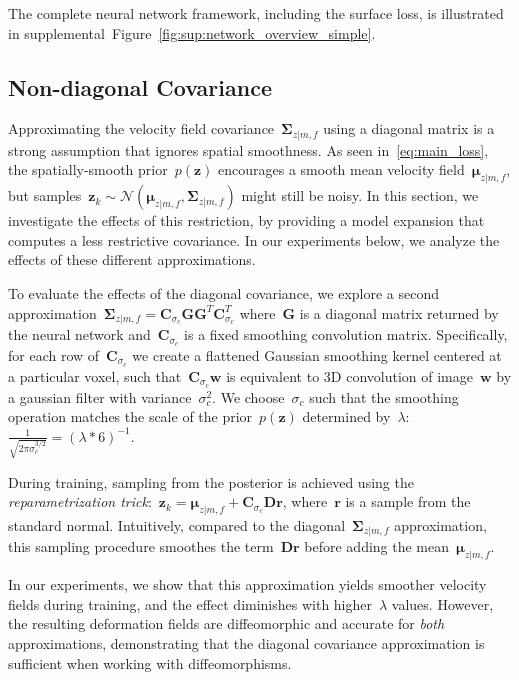 \documentclass{article}
\newcommand{\bC}{\boldsymbol{C}}
\newcommand{\bD}{\boldsymbol{D}}
\newcommand{\bw}{\boldsymbol{w}}
\newcommand{\br}{\boldsymbol{r}}
\newcommand{\bG}{\boldsymbol{G}}
\newcommand{\bmu}{\boldsymbol{\mu}}
\newcommand{\bSigma}{\boldsymbol{\Sigma}}
\newcommand{\bz}{\boldsymbol{z}}
\newcommand{\moving}{m}
\newcommand{\fixed}{f}
\begin{document}
The complete neural network framework, including the surface loss, is illustrated in supplemental~Figure~\ref{fig:sup:network_overview_simple}.




\subsection{Non-diagonal Covariance}
\label{sec:nondiag-approx}


{\color{blue} Approximating the velocity field covariance~$\bSigma_{z | \moving, \fixed}$ using a diagonal matrix is a strong assumption that ignores spatial smoothness. As seen in~\eqref{eq:main_loss}, the spatially-smooth prior~$p(\bz)$ encourages a smooth mean velocity field~$\bmu_{z | \moving, \fixed}$, but samples~\mbox{$\bz_k \sim \mathcal{N}(\bmu_{z | \moving, \fixed}, \bSigma_{z | \moving, \fixed})$} might still be noisy. In this section, we investigate the effects of this restriction, by providing a model expansion that computes a less restrictive covariance. In our experiments below, we analyze the effects of these different approximations.}


To evaluate the effects of the diagonal covariance, we explore a second approximation~$\bSigma_{z | \moving, \fixed} = \bC_{\sigma_c} \bG \bG^{T} \bC_{\sigma_c}^{T}$ where~$\bG$ is a diagonal matrix returned by the neural network and~$\bC_{\sigma_c}$ is a fixed smoothing convolution matrix.  Specifically, for each row of~$\bC_{\sigma_c}$ we create a flattened Gaussian smoothing kernel centered at a particular voxel, such that~$\bC_{\sigma_c}\bw$ is equivalent to 3D convolution of image~$\bw$ by a gaussian filter with variance~$\sigma_c^2$. We choose~$\sigma_c$ such that the smoothing operation matches the scale of the prior~$p(\bz)$ determined by~$\lambda$:~$\frac{1}{\sqrt{2\pi\sigma_c^{3/2}}} = (\lambda*6)^{-1}$. 

During training, sampling from the posterior is achieved using the \textit{reparametrization trick}:~$\bz_k = \bmu_{z | \moving, \fixed} + \bC_{\sigma_c} \bD \br$, where~$\br$ is a sample from the standard normal. Intuitively, compared to the diagonal~$\bSigma_{z |\moving, \fixed}$ approximation, this sampling procedure smoothes the term~$\bD\br$ before adding the mean~$\bmu_{z|\moving,\fixed}$.

In our experiments, we show that this approximation yields smoother velocity fields during training, and the effect diminishes with higher~$\lambda$ values. However, the resulting deformation fields are diffeomorphic and accurate for \textit{both} approximations, demonstrating that the diagonal covariance approximation is sufficient when working with diffeomorphisms.
\end{document}
